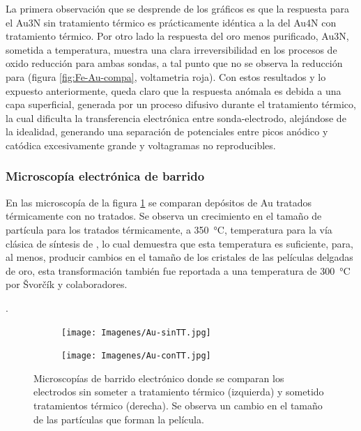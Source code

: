 {			La primera observación que se desprende de los gráficos es que la respuesta para el Au3N sin tratamiento térmico es prácticamente idéntica a la del Au4N con tratamiento térmico. Por otro lado la respuesta del oro menos purificado, Au3N, sometida a temperatura, muestra una clara irreversibilidad en los procesos de oxido reducción para ambas sondas, a tal punto que no se observa la reducción para \ferroferri\space (figura \ref{fig:Fe-Au-compa}, voltametria roja). Con estos resultados y lo expuesto anteriormente, queda claro que la respuesta anómala es debida a una capa superficial, generada por un proceso difusivo durante el tratamiento térmico, la cual dificulta la transferencia electrónica entre sonda-electrodo, alejándose de la idealidad, generando una separación de potenciales entre picos anódico y catódica excesivamente grande y voltagramas no reproducibles.
			

			
		\subsubsection{Microscopía electrónica de barrido}
			  		
			 En las microscopía de la figura \ref{fig:Au_compTT} se comparan depósitos de Au tratados térmicamente con no tratados. Se observa un crecimiento en el tamaño de partícula para los tratados térmicamente, a \SI{350}{\celsius}, temperatura para la vía clásica de síntesis de \pdm, lo cual demuestra que esta temperatura es suficiente, para, al menos, producir cambios en el tamaño de los cristales de las películas delgadas de oro, esta transformación también fue reportada a una temperatura de \SI{300}{\celsius} por \v{S}vor\v{c}\'ik y colaboradores.}\cite{Svorcik2010}.
			 		\begin{figure}[th]
		 	   	    \begin{subfigure}[t]{0.49\textwidth}
			       	\texttt{[image: Imagenes/Au-sinTT.jpg]}
			   		\end{subfigure}
			   		\begin{subfigure}[t]{0.49\textwidth}
			   	    \texttt{[image: Imagenes/Au-conTT.jpg]}
			   		\end{subfigure}
					 \caption[Microscopía comparativa electrodos Au]{Microscopías de barrido electrónico donde se comparan los electrodos sin someter a tratamiento térmico (izquierda) y sometido tratamientos térmico (derecha). Se observa un cambio en el tamaño de las partículas que forman la película.}
					 \label{fig:Au_compTT}	
				     \end{figure}
		 		 		
